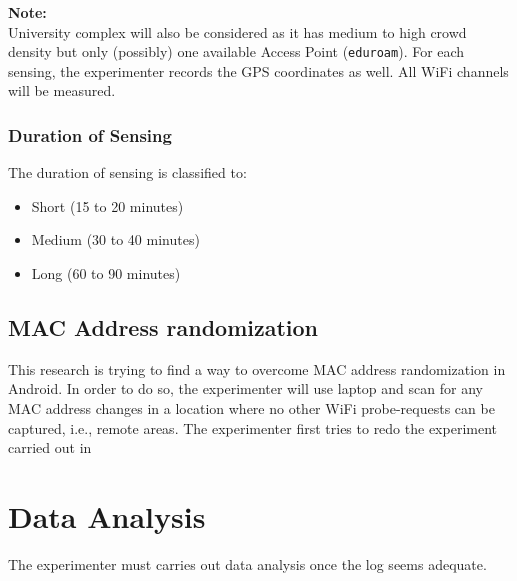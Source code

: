 \documentclass{article}
\begin{document}
\noindent\textbf{Note:}\\
University complex will also be considered as it has medium to high crowd density but only (possibly) one available Access Point (\texttt{eduroam}). For each sensing, the experimenter records the GPS coordinates as well. All WiFi channels will be measured.

\subsubsection*{Duration of Sensing} %
\label{ssub:duration_of_sensing}
The duration of sensing is classified to:
\begin{itemize}
	\item Short (15 to 20 minutes)
	\item Medium (30 to 40 minutes)
	\item Long (60 to 90 minutes)
\end{itemize}


\subsection{MAC Address randomization} %
\label{sub:mac_address_randomization}
This research is trying to find a way to overcome MAC address randomization in Android. In order to do so, the experimenter will use laptop and scan for any MAC address changes in a location where no other WiFi probe-requests can be captured, i.e., remote areas. The experimenter first tries to redo the experiment carried out in~\cite{thesis060,thesis061,randomization}

\section{Data Analysis} %
\label{sec:data_processing_and_analysis}
The experimenter must carries out data analysis once the log seems adequate.
\end{document}
